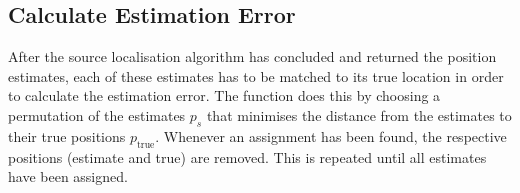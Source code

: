 \subsection{Calculate Estimation Error}
After the source localisation algorithm has concluded and returned the position estimates, each of these estimates has to be matched to its true location in order to calculate the estimation error. The function  does this by choosing a permutation of the estimates $p_s$ that minimises the distance from the estimates to their true positions $p_{\text{true}}$. Whenever an assignment has been found, the respective positions (estimate and true) are removed. This is repeated until all estimates have been assigned.
